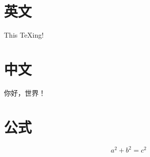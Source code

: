 \documentclass{ctexart}
\begin{document}
\section{英文}\label{sec:text}
	This \TeX ing! 

\section{中文}
	你好，世界！
	
\section{公式}
	\[a^2 + b^2 = c^2\]
\end{document}
